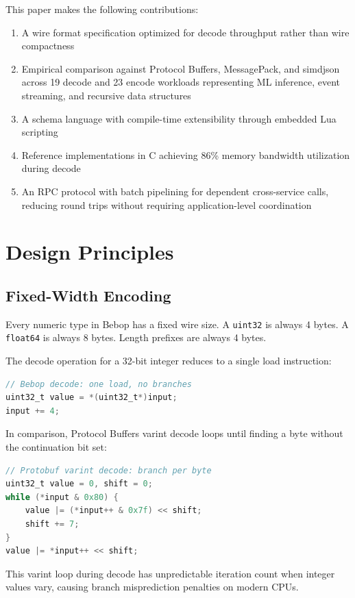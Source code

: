\documentclass[10pt,onecolumn]{article}
\begin{document}
\begin{minipage}{\textwidth}
This paper makes the following contributions:

\begin{enumerate}[leftmargin=2em,itemsep=4pt,topsep=8pt]
\item A wire format specification optimized for decode throughput rather than wire compactness
\item Empirical comparison against Protocol Buffers, MessagePack, and simdjson across 19 decode and 23 encode workloads representing ML inference, event streaming, and recursive data structures
\item A schema language with compile-time extensibility through embedded Lua scripting
\item Reference implementations in C achieving 86\% memory bandwidth utilization during decode
\item An RPC protocol with batch pipelining for dependent cross-service calls, reducing round trips without requiring application-level coordination
\end{enumerate}
\end{minipage}


\section{Design Principles}

\subsection{Fixed-Width Encoding}

Every numeric type in Bebop has a fixed wire size. A \texttt{uint32} is always 4 bytes. A \texttt{float64} is always 8 bytes. Length prefixes are always 4 bytes.

\begin{minipage}{\textwidth}
The decode operation for a 32-bit integer reduces to a single load instruction:

\begin{lstlisting}[language=C]
// Bebop decode: one load, no branches
uint32_t value = *(uint32_t*)input;
input += 4;
\end{lstlisting}

In comparison, Protocol Buffers varint decode loops until finding a byte without the continuation bit set:

\begin{lstlisting}[language=C]
// Protobuf varint decode: branch per byte
uint32_t value = 0, shift = 0;
while (*input & 0x80) {
    value |= (*input++ & 0x7f) << shift;
    shift += 7;
}
value |= *input++ << shift;
\end{lstlisting}

This varint loop during decode has unpredictable iteration count when integer values vary, causing branch misprediction penalties on modern CPUs.
\end{minipage}
\end{document}
